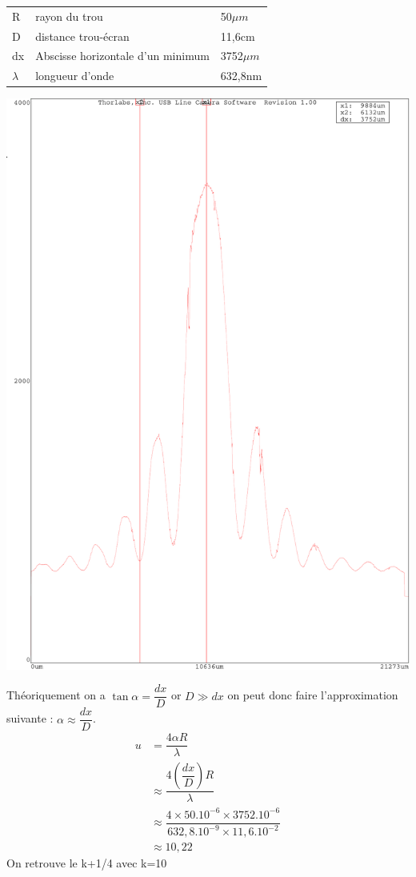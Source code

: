 \documentclass[12pt,a4paper]{article}
\begin{document}
	
	\bgroup
	\setlength{\tabcolsep}{1.5em}
	\def\arraystretch{1.25}
	\begin{tabular}{lll}
		\hline
		\hline
		R &  rayon du trou & 50$\mu m$  \\ 
		D & distance trou-écran &  11,6cm\\ 
		dx& Abscisse horizontale d'un minimum &  3752$\mu m$\\ 
		$\lambda$& longueur d'onde &  632,8nm\\ 
		\hline 
		\hline
	\end{tabular}  
	\egroup
	
	\begin{center}
		\includegraphics[scale=0.35]{res/trou2}
	\end{center}
	Théoriquement on a $\tan\alpha=\dfrac{dx}{D}$ or $D\gg dx$ on peut donc faire l'approximation suivante : $\alpha\approx\dfrac{dx}{D}$.
	\bgroup
	\addtolength{\jot}{4pt}
	\begin{align*}
	u&=\dfrac{4\alpha R}{\lambda}\\
	&\approx\dfrac{4 \left(\dfrac{dx}{D}\right) R }{\lambda}\\
	&\approx\dfrac{4\times50.10^{-6}\times3752.10^{-6}}{632,8.10^{-9}\times11,6.10^{-2}}\\
	&\approx10,22
	\end{align*}
	\egroup
	On retrouve le k+1/4 avec k=10
\end{document}
